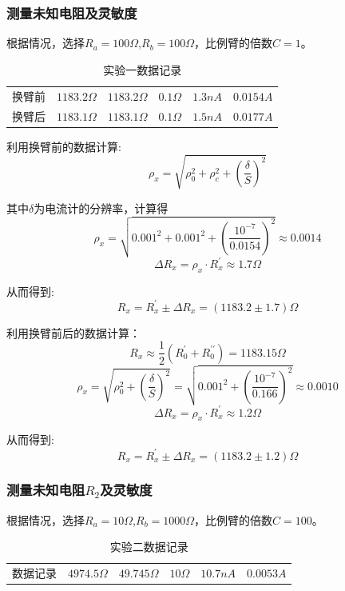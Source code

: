 \documentclass[12pt,a4paper,UTF8]{ctexart}
\begin{document}
	\subsubsection*{测量未知电阻及灵敏度}
	\par 根据情况，选择$R_a=100\Omega$,$R_b=100\Omega$，比例臂的倍数$C=1$。
	\begin{table}[!htbp]
		\renewcommand{\arraystretch}{1.5}
		\centering
		\caption{实验一数据记录}
		\begin{tabular}{cccccc}
			\toprule
			\makebox[0.18\textwidth][c]{电桥状态} & \makebox[0.13\textwidth][c]{$R_0$}& \makebox[0.13\textwidth][c]{$R_1$}& \makebox[0.13\textwidth][c]{$\Delta R_0$}& \makebox[0.13\textwidth][c]{$\Delta I$}& \makebox[0.13\textwidth][c]{$S_1$}\\
			\midrule
			换臂前& $1183.2\Omega$&  $1183.2\Omega$& $0.1\Omega$&$1.3nA$ & $0.0154A$\\
			换臂后& $1183.1\Omega$&  $1183.1\Omega$& $0.1\Omega$&$1.5nA$ & $0.0177A$\\
		\bottomrule		
		\end{tabular}
	\end{table}
	\clearpage
	\par 利用换臂前的数据计算:
	\[\rho_x=\sqrt{\rho_0^2+\rho_c^2+\left(\frac{\delta}{S}\right)^2}\]
	\par 其中$\delta$为电流计的分辨率，计算得
	\[\rho_x=\sqrt{0.001^2+0.001^2+\left(\frac{10^{-7}}{0.0154}\right)^2}\approx0.0014\]
	\[ \Delta R_x = \rho_x\cdot R_{x}^{\prime}\approx 1.7\Omega\]
	\par 从而得到:
	\[ R_x = R_{x}^{\prime}\pm \Delta R_x=(1183.2\pm 1.7) \Omega\]
	\par 利用换臂前后的数据计算：
	\[R_x\approx \frac{1}{2}(R_0^{\prime}+R_0^{\prime\prime})=1183.15\Omega\]
	\[\rho_x=\sqrt{\rho_0^2+\left(\frac{\delta}{S}\right)^2}=\sqrt{0.001^2+\left(\frac{10^{-7}}{0.166}\right)^2}\approx0.0010\]
	\[ \Delta R_x = \rho_x\cdot R_{x}^{\prime}\approx 1.2\Omega\]
	\par 从而得到:
	\[ R_x = R_{x}^{\prime}\pm \Delta R_x=(1183.2\pm 1.2) \Omega\]
	\subsubsection*{测量未知电阻$R_2$及灵敏度}
			\par 根据情况，选择$R_a=10\Omega$,$R_b=1000\Omega$，比例臂的倍数$C=100$。
		\begin{table}[!htbp]
		\renewcommand{\arraystretch}{1.5}
		\centering
		\caption{实验二数据记录}
		\begin{tabular}{cccccc}
			\toprule
			\makebox[0.18\textwidth][c]{电桥状态} & \makebox[0.13\textwidth][c]{$R_0$}& \makebox[0.13\textwidth][c]{$R_1$}& \makebox[0.13\textwidth][c]{$\Delta R_0$}& \makebox[0.13\textwidth][c]{$\Delta I$}& \makebox[0.13\textwidth][c]{$S_1$}\\
			\midrule
			数据记录& $4974.5\Omega$&  $49.745\Omega$& $10\Omega$&$10.7nA$ & $0.0053A$\\
			\bottomrule		
		\end{tabular}
	\end{table}
	
\end{document}
